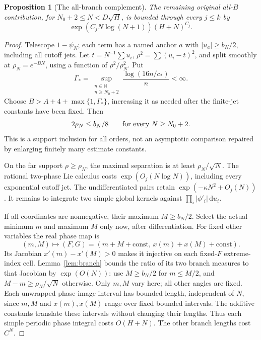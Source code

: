 \documentclass[11pt]{article}
\numberwithin{equation}{section}
\newtheorem{proposition}[theorem]{Proposition}
\theoremstyle{definition}
\newcommand{\dd}{\,\mathrm d}
\begin{document}
\begin{proposition}[The all-branch complement]\label{prop:allB}
The remaining original all-\(B\) contribution, for
\(N_0+2\le N<D\sqrt H\), is bounded through every \(j\le k\) by
\[
 \exp(C_jN\log(N+1))(H+N)^{C_j}.
\]
\end{proposition}
\begin{proof}
Telescope \(1-\psi_N\); each term has a named anchor \(a\) with
\(|u_a|\ge b_N/2\), including all cutoff jets.
Let \(t=N^{-1}\sum u_i\), \(\rho^2=\sum(u_i-t)^2\), and split
smoothly at \(\rho_N=e^{-BN}\), using a function of
\(\rho^2/\rho_N^2\). Put
\[
 \Gamma_* = \sup_{\substack{n\in\mathbb N\\n\ge N_0+2}}
                   \frac{\log(16n/c_*)}{n}<\infty.
\]
Choose \(B>A+4+\max\{1,\Gamma_*\}\), increasing it as needed
after the finite-jet constants have been fixed. Then
\[
 2\rho_N\le b_N/8\qquad\hbox{for every }N\ge N_0+2.
\]
This is a support inclusion for all orders, not an asymptotic
comparison repaired by enlarging finitely many estimate constants.

On the far support \(\rho\ge\rho_N\), the maximal separation
is at least \(\rho_N/\sqrt N\). The rational two-phase Lie
calculus costs \(\exp(O_j(N\log N))\), including every exponential
cutoff jet. The undifferentiated pairs retain
\(\exp(-\kappa N^2+O_j(N))\).
It remains to integrate two simple global kernels against
\(\prod_i|\phi'_i|\dd u_i\).

If all coordinates are nonnegative, their maximum \(M\ge b_N/2\).
Select the actual minimum \(m\) and maximum \(M\) only now,
after differentiation. For fixed other variables the real phase
map is
\[
 (m,M)\longmapsto(F,G)
    =(m+M+\mathrm{const},\,x(m)+x(M)+\mathrm{const}).
\]
Its Jacobian \(x'(m)-x'(M)>0\) makes it injective on each fixed-\(F\)
extreme-index cell. Lemma~\ref{lem:branch} bounds the ratio of its
two branch measures to that Jacobian by \(\exp(O(N))\):
use \(M\ge b_N/2\) for \(m\le M/2\), and
\(M-m\ge\rho_N/\sqrt N\) otherwise.
Only \(m,M\) vary here; all other angles are fixed. Each unwrapped
phase-image interval has bounded length, independent of \(N\), since
\(m,M\) and \(x(m),x(M)\) range over fixed bounded intervals.
The additive constants translate these intervals without changing
their lengths. Thus each simple periodic phase integral costs
\(O(H+N)\). The other branch lengths cost \(C^N\).


\end{proof}
\end{document}

